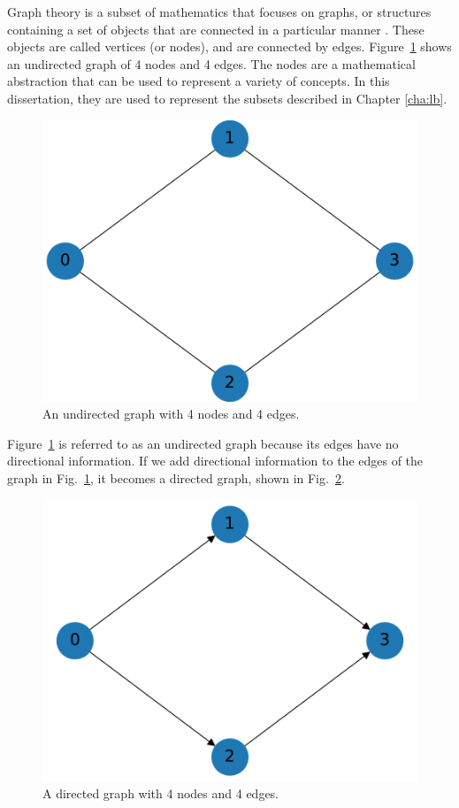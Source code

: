 Graph theory is a subset of mathematics that focuses on graphs, or structures containing a set of objects that are connected in a particular manner \cite{graphtheory}.
These objects are called vertices (or nodes), and are connected by edges.
Figure~\ref{basic_graph} shows an undirected graph of 4 nodes and 4 edges. The nodes are a mathematical abstraction that can be used to represent a variety of concepts. In this dissertation, they are used to represent the subsets described in Chapter \ref{cha:lb}.
\begin{figure}[H]
\centering
\includegraphics[scale=0.5]{../../figures/undirected_graph.pdf}
\caption{An undirected graph with 4 nodes and 4 edges. }
\label{basic_graph}
\end{figure}
Figure~\ref{basic_graph} is referred to as an undirected graph because its edges have no directional information.
If we add directional information to the edges of the graph in Fig.~\ref{basic_graph}, it becomes a directed graph, shown in Fig.~\ref{directed_graph}.
\begin{figure}[H]
\centering
\includegraphics[scale=0.5]{../../figures/directed_graph.pdf}
\caption{A directed graph with 4 nodes and 4 edges. }
\label{directed_graph}
\end{figure}
